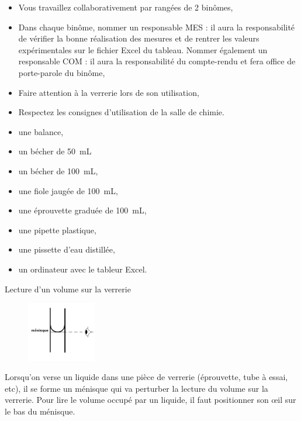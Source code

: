 \begin{tcolorbox}[colback=red!5!white,colframe=red!75!black,title= Consignes :]
\begin{itemize}
    \item Vous travaillez collaborativement par rangées de 2 binômes,
    \item Dans chaque binôme, nommer un responsable \og MES \fg : il aura la responsabilité de vérifier la bonne réalisation des mesures et de rentrer les valeurs expérimentales sur le fichier Excel du tableau. Nommer également un responsable \og COM \fg : il aura la responsabilité du compte-rendu et fera office de porte-parole du binôme,
    \item Faire attention à la verrerie lors de son utilisation,
    \item Respectez les consignes d'utilisation de la salle de chimie.
\end{itemize}

\end{tcolorbox}
\begin{mdframed}[style=autreexo]
\textbf{}
\vspace{-0.5cm}
\begin{multicols}{2}
\begin{itemize}
    \item une balance, 
    \item un bécher de 50~mL
    \item un bécher de 100~mL,
    \item une fiole jaugée de 100~mL,
    \item une éprouvette graduée de 100~mL,
    \item une pipette plastique,
    \item une pissette d'eau distillée,
    \item un ordinateur avec le tableur Excel.    
\end{itemize}
\end{multicols}
\end{mdframed}

\newpage
\begin{doc}{Lecture d'un volume sur la verrerie}

\begin{figure}
\vspace{-2cm}
    \centering
      \includegraphics[width=0.27\textwidth]{Images/Lecture_Verrerie.png}
  \end{figure}
  Lorsqu'on verse un liquide dans une pièce de verrerie (éprouvette, tube à essai, etc), il se forme un ménisque qui va perturber la lecture du volume sur la verrerie. Pour lire le volume occupé par un liquide, il faut positionner son \oe il sur le bas du ménisque.
\end{doc}

